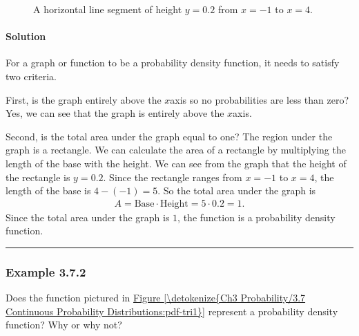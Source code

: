 \documentclass[letterpaper,10pt,english]{jupyterBook}
\begin{document}
\begin{figure}[htbp]
\centering
\capstart

\noindent{}
\caption{A horizontal line segment of height \(y = 0.2\) from \(x = -1\) to \(x = 4\).}\label{\detokenize{Ch3 Probability/3.7 Continuous Probability Distributions:pdf-rect1}}\end{figure}


\paragraph{Solution}
\label{\detokenize{Ch3 Probability/3.7 Continuous Probability Distributions:solution}}
\sphinxAtStartPar
For a graph or function to be a probability density function, it needs to satisfy two criteria.

\sphinxAtStartPar
First, is the graph entirely above the \(x\)\sphinxhyphen{}axis so no probabilities are less than zero? Yes, we can see that the graph is entirely above the \(x\)\sphinxhyphen{}axis.

\sphinxAtStartPar
Second, is the total area under the graph equal to one? The region under the graph is a rectangle. We can calculate the area of a rectangle by multiplying the length of the base with the height. We can see from the graph that the height of the rectangle is \(y = 0.2\). Since the rectangle ranges from \(x = -1\) to \(x = 4\), the length of the base is \(4 - (-1) = 5\). So the total area under the graph is
\begin{equation*}
\begin{split} A = \text{Base} \cdot \text{Height} = 5 \cdot 0.2 = 1. \end{split}
\end{equation*}
\sphinxAtStartPar
Since the total area under the graph is \(1\), the function is a probability density function.


\bigskip\hrule\bigskip



\subsubsection{Example 3.7.2}
\label{\detokenize{Ch3 Probability/3.7 Continuous Probability Distributions:example-3-7-2}}
\sphinxAtStartPar
Does the function pictured in \hyperref[\detokenize{Ch3 Probability/3.7 Continuous Probability Distributions:pdf-tri1}]{Figure \ref{\detokenize{Ch3 Probability/3.7 Continuous Probability Distributions:pdf-tri1}}} represent a probability density function? Why or why not?
\end{document}
